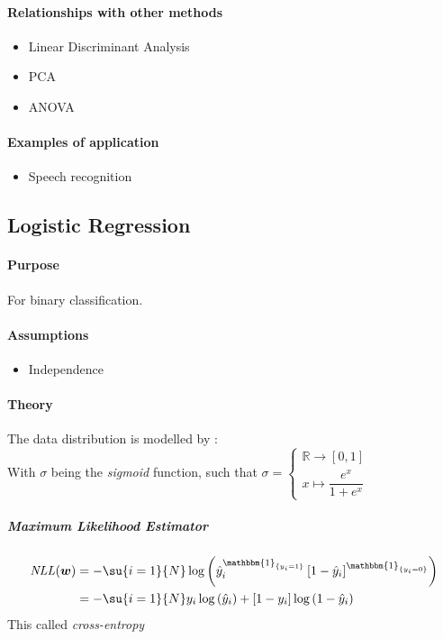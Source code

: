 \paragraph{Relationships with other methods}
\begin{itemize}
    \item Linear Discriminant Analysis
    \item PCA
    \item ANOVA
\end{itemize}

\paragraph{Examples of application}
\begin{itemize}
    \item Speech recognition
\end{itemize}

\subsection{Logistic Regression}
\paragraph{Purpose}
For binary classification. 
\paragraph{Assumptions}
\begin{itemize}
    \item Independence
\end{itemize}

\paragraph{Theory}
The data distribution is modelled by : 
\\
With $\sigma$ being the \emph{sigmoid} function, such that 
$\sigma = \begin{cases}
    \mathbb{R} \longrightarrow [0, 1]\\ 
    x \mapsto \dfrac{e^{x}}{1 + e^{x}}
\end{cases}
$
\subparagraph{Maximum Likelihood Estimator}
\begin{align*}
    \text{\emph{NLL}}(\bm{w})
    &= -\su{i=1}{N}\log\left(\hat{y}_{i}^{\mathbbm{1}_{\{y_{i} = 1\}}}\left[1 -
    \hat{y}_{i}\right]^{\mathbbm{1}_{\{y_{i}=0\}}}\right)\\ 
    &= -\su{i=1}{N}y_{i}\log\left(\hat{y}_{i}\right) + \left[1 -y_{i}\right]\log
    \left(1 -\hat{y}_{i}\right)
\end{align*}
This called \textit{cross-entropy}


